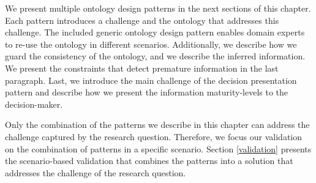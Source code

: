 We present multiple ontology design patterns in the next sections of this chapter. Each pattern introduces a challenge and the ontology that addresses this challenge. The included generic ontology design pattern enables domain experts to re-use the ontology in different scenarios. Additionally, we describe how we guard the consistency of the ontology, and we describe the inferred information. We present the constraints that detect premature information in the last paragraph. Last, we introduce the main challenge of the decision presentation pattern and describe how we present the information maturity-levels to the decision-maker.

Only the combination of the patterns we describe in this chapter can address the challenge captured by the research question. Therefore, we focus our validation on the combination of patterns in a specific scenario. Section \ref{validation}  presents the scenario-based validation that combines the patterns into a solution that addresses the challenge of the research question.

 


